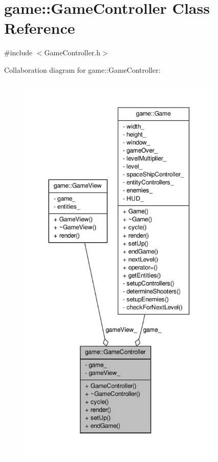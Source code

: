 \hypertarget{classgame_1_1GameController}{\section{game\-:\-:\-Game\-Controller \-Class \-Reference}
\label{d6/d98/classgame_1_1GameController}
}


{\ttfamily \#include $<$\-Game\-Controller.\-h$>$}



\-Collaboration diagram for game\-:\-:\-Game\-Controller\-:
\nopagebreak
\begin{figure}[H]
\begin{center}
\leavevmode
\includegraphics[height=550pt]{d9/ddf/classgame_1_1GameController__coll__graph}
\end{center}
\end{figure}
